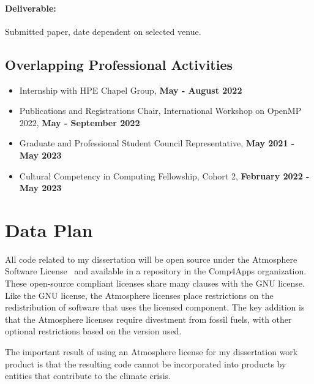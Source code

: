 \documentclass{article}
\begin{document}
\paragraph{Deliverable:} Submitted paper, date dependent on selected venue.


\subsection{Overlapping Professional Activities}
\begin{itemize}
\item Internship with HPE Chapel Group, \textbf{May - August 2022} 
\item Publications and Registrations Chair, International Workshop on OpenMP 2022, \textbf{May - September 2022}
\item Graduate and Professional Student Council Representative, \textbf{May 2021 - May 2023}
\item Cultural Competency in Computing Fellowship, Cohort 2, \textbf{February 2022 - May 2023}
\end{itemize}

\section{Data Plan}
\label{Sec:DataPlan}
All code related to my dissertation will be open source under the Atmosphere Software License~\cite{atmospherelicense} and available in a repository in the Comp4Apps organization. 
These open-source compliant licenses share many clauses with the GNU license. 
Like the GNU license, the Atmosphere licenses place restrictions on the redistribution of software that uses the licensed component.
The key addition is that the Atmosphere licenses require divestment from fossil fuels, with other optional restrictions based on the version used. 

The important result of using an Atmosphere license for my dissertation work product is that the resulting code cannot be incorporated into products by entities that contribute to the climate crisis.




\end{document}
